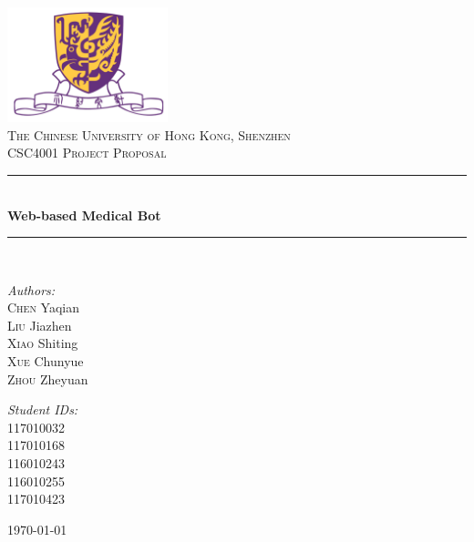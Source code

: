 \documentclass[11pt,bibliography=totocnumbered]{article}
\newcommand{\HRule}{\rule{\linewidth}{0.5mm}}
\begin{document}
  \begin{titlepage}
  	
  	\begin{center}
  		
  		\includegraphics[width=0.35\textwidth]{./figures/logo.png}\\[0.5cm]    
  		
  		\textsc{\Large The Chinese University of Hong Kong, Shenzhen}\\[1.5cm]
  		
  		\textsc{\large CSC4001 Project Proposal}\\[0.5cm]
  		
  		\HRule \\[0.6cm]
  		{ \huge \bfseries Web-based Medical Bot}\\[0.4cm]
  		
  		\HRule \\[1.5cm]
  		
  		\begin{minipage}{0.4\textwidth}
  			\begin{flushleft} \large
  				\emph{Authors:}\\[0.5cm]
  				\textsc{Chen} Yaqian\\[0.5cm]
  				\textsc{Liu} Jiazhen\\[0.5cm]
  				\textsc{Xiao} Shiting\\[0.5cm]
  				\textsc{Xue} Chunyue \\[0.5cm]
  				\textsc{Zhou} Zheyuan\\[0.5cm]
  			\end{flushleft}
  		\end{minipage}
  		\begin{minipage}{0.4\textwidth}
  			\begin{flushright} \large
  				\emph{Student IDs:} \\[0.5cm]
  				117010032\\[0.5cm]
  				117010168\\[0.5cm]
  				116010243\\[0.5cm]
  				116010255\\[0.5cm]
  				117010423\\[0.5cm]
  			\end{flushright}
  		\end{minipage}
  		\vfill
  		
  		{\large \today}
  		
  	\end{center}
  	
  \end{titlepage}
\end{document}
